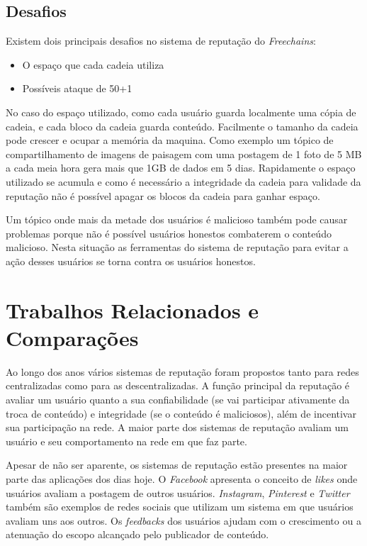 \documentclass[12pt]{article}
\newcommand{\FC} {\emph{Freechains}\xspace}
\begin{document}
\subsection{Desafios} \label{subsec:fraq}

Existem dois principais desafios no sistema de reputação do \FC:

\begin{itemize}
    \item O espaço que cada cadeia utiliza
    \item Possíveis ataque de 50+1%
\end{itemize}

No caso do espaço utilizado, como cada usuário guarda localmente uma cópia de cadeia, e cada bloco da cadeia guarda conteúdo. Facilmente o tamanho da cadeia pode crescer e ocupar a memória da maquina. Como exemplo um tópico de compartilhamento de imagens de paisagem com uma postagem de 1 foto de 5 MB a cada meia hora gera mais que 1GB de dados em 5 dias. Rapidamente o espaço utilizado se acumula e como é necessário a integridade da cadeia para validade da reputação não é possível apagar os blocos da cadeia para ganhar espaço.

Um tópico onde mais da metade dos usuários é malicioso também pode causar problemas porque não é possível usuários honestos combaterem o conteúdo malicioso. Nesta situação as ferramentas do sistema de reputação para evitar a ação desses usuários se torna contra os usuários honestos.

\section{Trabalhos Relacionados e Comparações} \label{sec:trabrec}

Ao longo dos anos vários sistemas de reputação foram propostos tanto para redes centralizadas como para as descentralizadas. A função principal da reputação é avaliar um usuário quanto a sua confiabilidade (se vai participar ativamente da troca de conteúdo) e integridade (se o conteúdo é maliciosos), além de incentivar sua participação na rede. A maior parte dos sistemas de reputação avaliam um usuário e seu comportamento na rede em que faz parte. 

Apesar de não ser aparente, os sistemas de reputação estão presentes na maior parte das aplicações dos dias hoje. O \emph{Facebook} apresenta o conceito de \emph{likes} onde usuários avaliam a postagem de outros usuários. \emph{Instagram}, \emph{Pinterest} e \emph{Twitter} também são exemplos de redes sociais que utilizam um sistema em que usuários avaliam uns aos outros. Os \emph{feedbacks} dos usuários ajudam com o crescimento ou a atenuação do escopo alcançado pelo publicador de conteúdo.  
\end{document}
